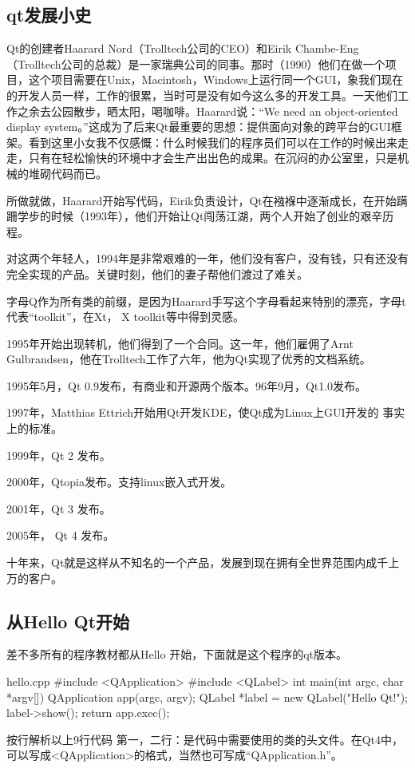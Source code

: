 \documentclass[11pt,oneside]{book}
\begin{document}
\begin{common-format}
\mainmatter

\chapter{qt发展小史}
Qt的创建者Haarard Nord（Trolltech公司的CEO）和Eirik Chambe-Eng（Trolltech公司的总裁）是一家瑞典公司的同事。那时（1990）他们在做一个项目，这个项目需要在Unix，Macintosh，Windows上运行同一个GUI，象我们现在的开发人员一样，工作的很累，当时可是没有如今这么多的开发工具。一天他们工作之余去公园散步，晒太阳，喝咖啡。Haarard说：“We need an object-oriented display system。”这成为了后来Qt最重要的思想：提供面向对象的跨平台的GUI框架。看到这里小女我不仅感慨：什么时候我们的程序员们可以在工作的时候出来走走，只有在轻松愉快的环境中才会生产出出色的成果。在沉闷的办公室里，只是机械的堆砌代码而已。

所做就做，Haarard开始写代码，Eirik负责设计，Qt在襁褓中逐渐成长，在开始蹒跚学步的时候（1993年），他们开始让Qt闯荡江湖，两个人开始了创业的艰辛历程。

对这两个年轻人，1994年是非常艰难的一年，他们没有客户，没有钱，只有还没有完全实现的产品。关键时刻，他们的妻子帮他们渡过了难关。

字母Q作为所有类的前缀，是因为Haarard手写这个字母看起来特别的漂亮，字母t代表“toolkit”，在Xt， X toolkit等中得到灵感。

1995年开始出现转机，他们得到了一个合同。这一年，他们雇佣了Arnt Gulbrandsen，他在Trolltech工作了六年，他为Qt实现了优秀的文档系统。

1995年5月，Qt 0.9发布，有商业和开源两个版本。96年9月，Qt1.0发布。

1997年，Matthias Ettrich开始用Qt开发KDE，使Qt成为Linux上GUI开发的 事实上的标准。

1999年，Qt 2 发布。

2000年，Qtopia发布。支持linux嵌入式开发。

2001年，Qt 3 发布。

2005年， Qt 4 发布。

十年来，Qt就是这样从不知名的一个产品，发展到现在拥有全世界范围内成千上万的客户。

\section{从Hello Qt开始}
差不多所有的程序教材都从Hello 开始，下面就是这个程序的qt版本。
\begin{xverbatim}{hello.cpp}
#include <QApplication>
#include <QLabel>
int main(int argc, char *argv[])
{
    QApplication app(argc, argv);
    QLabel *label = new QLabel("Hello Qt!");
    label->show();
    return app.exec();
}
\end{xverbatim}
按行解析以上9行代码
第一，二行：是代码中需要使用的类的头文件。在Qt4中，可以写成<QApplication>的格式，当然也可写成“QApplication.h”。


\end{common-format}
\end{document}
